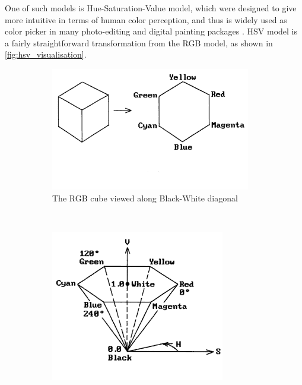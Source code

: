 \documentclass{report}
\begin{document}
One of such models is Hue-Saturation-Value model, which were designed to give more intuitive in terms of human color perception, and thus is widely used as color picker in many photo-editing and digital painting packages \cite{color_model_ref}.
HSV model is a fairly straightforward transformation from the RGB model, as shown in \ref{fig:hsv_visualisation}.

\begin{figure}[hbtp]
        \centering
        \begin{subfigure}[b]{0.3\textwidth}
                \includegraphics[width=\textwidth]{graphics/hsv_cube.png}
                \caption{The RGB cube viewed along Black-White diagonal}
                \label{fig:gull}
        \end{subfigure}%
        ~
        \begin{subfigure}[b]{0.3\textwidth}
                \includegraphics[width=\textwidth]{graphics/hsv_rescale1.png}

\end{subfigure}
\end{figure}
\end{document}
